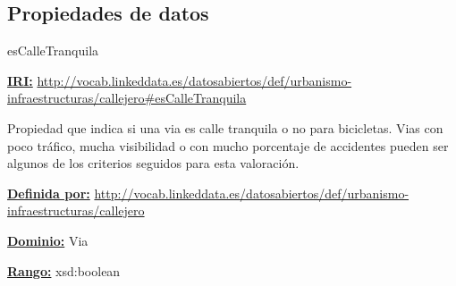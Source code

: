 \subsection{Propiedades de datos}




\begin{mybox}{esCalleTranquila}
\begin{flushleft}
\underline{\textbf{IRI:}}
\url{http://vocab.linkeddata.es/datosabiertos/def/urbanismo-infraestructuras/callejero#esCalleTranquila}
\newline

Propiedad que indica si una via es calle tranquila o no para bicicletas. Vias con poco tráfico, mucha visibilidad o con mucho porcentaje de accidentes pueden ser algunos de los criterios seguidos para esta valoración.
\newline


\underline{\textbf{Definida por:}}\newline
\url{http://vocab.linkeddata.es/datosabiertos/def/urbanismo-infraestructuras/callejero}
\newline

\underline{\textbf{Dominio:}}
	Via
\newline

\underline{\textbf{Rango:}}
		xsd:boolean

\end{flushleft}
\end{mybox}






